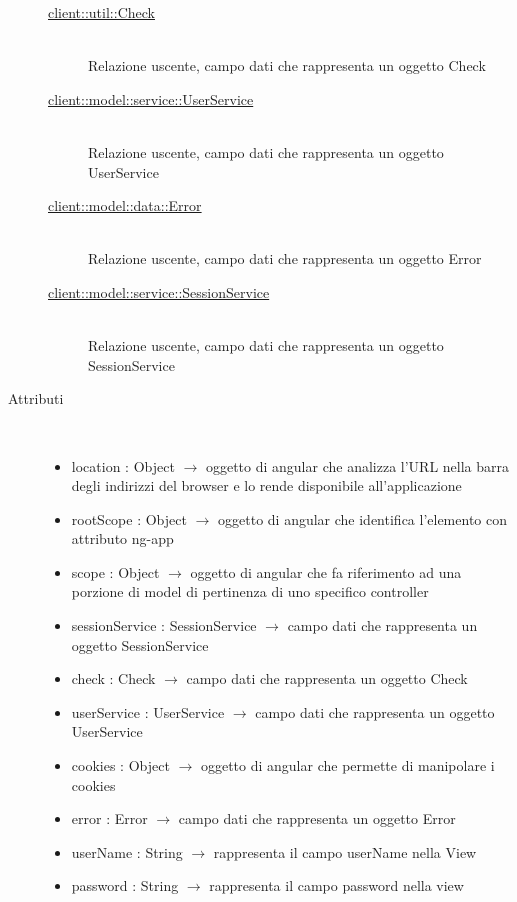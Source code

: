 \begin{description}
\begin{description}
	\item[\hyperlink{client::util::Check}{client::util::Check}] \hfill \\
	Relazione uscente, campo dati che rappresenta un oggetto Check
	\item[\hyperlink{client::model::service::UserService}{client::model::service::UserService}] \hfill \\
	Relazione uscente, campo dati che rappresenta un oggetto UserService
	\item[\hyperlink{client::model::data::Error}{client::model::data::Error}] \hfill \\
	Relazione uscente, campo dati che rappresenta un oggetto Error
	\item[\hyperlink{client::model::service::SessionService}{client::model::service::SessionService}] \hfill \\
	Relazione uscente, campo dati che rappresenta un oggetto SessionService
\end{description}

\item[Attributi] \hfill \\
\vspace{-7mm}
\begin{itemize}
	\item location : Object $\rightarrow$ oggetto di angular che analizza l'URL nella barra degli indirizzi del browser e lo rende disponibile all'applicazione
	\item rootScope : Object $\rightarrow$ oggetto di angular che identifica l’elemento con attributo ng-app
	\item scope : Object $\rightarrow$ oggetto di angular che fa riferimento ad una porzione di model di pertinenza di uno specifico controller
	\item sessionService : SessionService $\rightarrow$ campo dati che rappresenta un oggetto SessionService
	\item check : Check $\rightarrow$ campo dati che rappresenta un oggetto Check
	\item userService : UserService $\rightarrow$ campo dati che rappresenta un oggetto UserService
	\item cookies : Object $\rightarrow$ oggetto di angular che permette di manipolare i cookies
	\item error : Error $\rightarrow$ campo dati che rappresenta un oggetto Error
	\item userName : String $\rightarrow$ rappresenta il campo userName nella View
	\item password : String $\rightarrow$ rappresenta il campo password nella view
\end{itemize}


\end{description}
